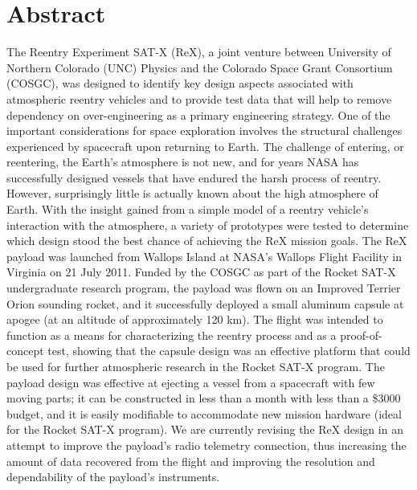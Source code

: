 \documentclass{article}
\begin{document}
\section{Abstract}
	\begin{doublespace}
	\indent\indent The Reentry Experiment SAT-X (ReX), a joint venture between University of Northern Colorado (UNC) Physics and the Colorado Space Grant Consortium (COSGC), was designed to identify key design aspects associated with atmospheric reentry vehicles and to provide test data that will help to remove dependency on over-engineering as a primary engineering strategy. One of the important considerations for space exploration involves the structural challenges experienced by spacecraft upon returning to Earth. The challenge of entering, or reentering, the Earth's atmosphere is not new, and for years NASA has successfully designed vessels that have endured the harsh process of reentry. However, surprisingly little is actually known about the high atmosphere of Earth. With the insight gained from a simple model of a reentry vehicle's interaction with the atmosphere, a variety of prototypes were tested to determine which design stood the best chance of achieving the ReX mission goals. The ReX payload was launched from Wallops Island at NASA's Wallops Flight Facility in Virginia on 21 July 2011. Funded by the COSGC as part of the Rocket SAT-X undergraduate research program, the payload was flown on an Improved Terrier Orion sounding rocket, and it successfully deployed a small aluminum capsule at apogee (at an altitude of approximately 120 km). The flight was intended to function as a means for characterizing the reentry process and as a proof-of-concept test, showing that the capsule design was an effective platform that could be used for further atmospheric research in the Rocket SAT-X program. The payload design was effective at ejecting a vessel from a spacecraft with few moving parts; it can be constructed in less than a month with less than a \$3000 budget, and it is easily modifiable to accommodate new mission hardware (ideal for the Rocket SAT-X program). We are currently revising the ReX design in an attempt to improve the payload's radio telemetry connection, thus increasing the amount of data recovered from the flight and improving the resolution and dependability of the payload's instruments.
	\end{doublespace}

\end{document}
